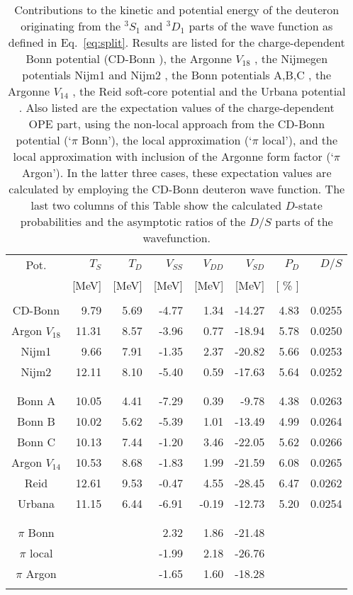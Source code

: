 \begin{table}
\begin{tabular}{| c | r r r r r r r |}
Pot. & $T_S$ & $T_D$ & $V_{SS}$ &  $V_{DD}$ & $V_{SD}$ & $P_D$ & $D/S$ \\
& [MeV] & [MeV] &[MeV] &[MeV] &[MeV] & [ \% ] & \\
\hline
&&&&&&&\\
CD-Bonn & 9.79 & 5.69 & -4.77 & 1.34 & -14.27 & 4.83 & 0.0255\\
Argon $V_{18}$ & 11.31 & 8.57 & -3.96 & 0.77 & -18.94 & 5.78 & 0.0250\\
Nijm1 & 9.66 & 7.91 & -1.35 & 2.37 & -20.82 & 5.66 & 0.0253\\
Nijm2 & 12.11 & 8.10 & -5.40 & 0.59 & -17.63 & 5.64 & 0.0252\\
&&&&&&&\\
\hline
&&&&&&&\\
Bonn A & 10.05 & 4.41 & -7.29 & 0.39 & -9.78 & 4.38 & 0.0263\\
Bonn B & 10.02 & 5.62 & -5.39 & 1.01 & -13.49 & 4.99 & 0.0264\\
Bonn C & 10.13 & 7.44 & -1.20 & 3.46 & -22.05 & 5.62 & 0.0266\\
Argon $V_{14}$ & 10.53 & 8.68 & -1.83 & 1.99 & -21.59 & 6.08 &0.0265 \\
Reid & 12.61 & 9.53 & -0.47 & 4.55 & -28.45 & 6.47 & 0.0262 \\
Urbana & 11.15 & 6.44 & -6.91 & -0.19 & -12.73 & 5.20 & 0.0254 \\
&&&&&&&\\
\hline
&&&&&&&\\
$\pi$ Bonn & & & 2.32 & 1.86 & -21.48 && \\
$\pi$ local & & & -1.99 & 2.18 & -26.76 && \\
$\pi$ Argon & & & -1.65 & 1.60 & -18.28 && \\
&&&&&&&\\
\end{tabular}
\caption{Contributions to the kinetic and potential energy 
of the deuteron originating from the 
$^3S_1$
and $^3D_1$ parts of the wave function as defined 
in Eq.\ \protect\ref{eq:split}. 
Results are
listed for the charge-dependent Bonn potential (CD-Bonn \protect\cite{cdbonn}),
the Argonne $V_{18}$ \protect\cite{v18}, the 
Nijmegen potentials Nijm1 and Nijm2
 \protect\cite{nim}, the Bonn potentials A,B,C \protect\cite{rup}, 
the Argonne
$V_{14}$ \protect\cite{v14}, the Reid soft-core potential \protect\cite{reid}
and the Urbana potential \protect\cite{urban}. Also listed are the expectation
values of the charge-dependent OPE part, using the non-local 
approach from the CD-Bonn potential (`$\pi$ Bonn'),
the local approximation (`$\pi$ local'), and the local approximation 
with inclusion of the
Argonne form factor (`$\pi$ Argon'). 
In the latter three cases, these expectation values are
calculated by employing 
the CD-Bonn deuteron
wave function. The last two columns of this Table show the calculated 
$D$-state
probabilities and the asymptotic ratios of the $D/S$ parts 
of the wavefunction.} 
\label{tab:tab1}
\end{table}

